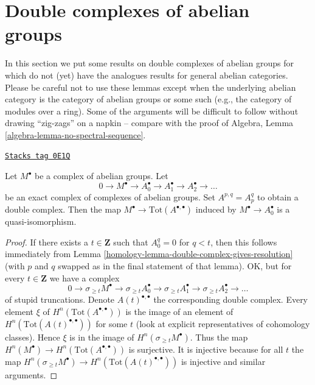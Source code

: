 \section{Double complexes of abelian groups}
\label{homology-section-double-complexes-abelian-groups}
In this section we put some results on double complexes of abelian groups
for which do not (yet) have the analogues results for general abelian
categories. Please be careful not to use these lemmas except when the
underlying abelian category is the category of abelian groups or some
such (e.g., the category of modules over a ring). Some of the arguments
will be difficult to follow without drawing ``zig-zags'' on a napkin --
compare with the proof of
Algebra, Lemma \ref{algebra-lemma-no-spectral-sequence}.

\begin{lemma}
\label{homology-lemma-right-resolution-gives-qis}
\href{https://stacks.math.columbia.edu/tag/0E1Q}{\texttt{Stacks tag 0E1Q}}

Let $M^\bullet$ be a complex of abelian groups. Let
$$
0 \to M^\bullet \to A_0^\bullet \to A_1^\bullet \to A_2^\bullet \to \ldots
$$
be an exact complex of complexes of abelian groups. Set
$A^{p, q} = A_p^q$ to obtain a double complex.
Then the map $M^\bullet \to \text{Tot}(A^{\bullet, \bullet})$
induced by $M^\bullet \to A_0^\bullet$ is a quasi-isomorphism.
\end{lemma}

\begin{proof}

If there exists a $t \in \mathbf{Z}$ such that $A_0^q = 0$ for $q < t$, then
this follows immediately from
Lemma \ref{homology-lemma-double-complex-gives-resolution}
(with $p$ and $q$ swapped as in the final statement of that lemma).
OK, but for every $t \in \mathbf{Z}$ we have a complex
$$
0 \to
\sigma_{\geq t}M^\bullet \to
\sigma_{\geq t}A_0^\bullet \to
\sigma_{\geq t}A_1^\bullet \to
\sigma_{\geq t}A_2^\bullet \to \ldots
$$
of stupid truncations. Denote $A(t)^{\bullet, \bullet}$ the corresponding
double complex. Every element $\xi$ of $H^n(\text{Tot}(A^{\bullet, \bullet}))$
is the image of an element of $H^n(\text{Tot}(A(t)^{\bullet, \bullet}))$
for some $t$ (look at explicit representatives of cohomology classes).
Hence $\xi$ is in the image of $H^n(\sigma_{\geq t}M^\bullet)$.
Thus the map $H^n(M^\bullet) \to H^n(\text{Tot}(A^{\bullet, \bullet}))$
is surjective. It is injective because for all $t$ the map
$H^n(\sigma_{\geq t}M^\bullet) \to H^n(\text{Tot}(A(t)^{\bullet, \bullet}))$
is injective and similar arguments.
\end{proof}

